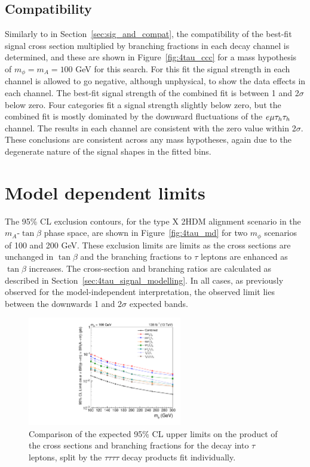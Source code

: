 \subsection{Compatibility}

Similarly to in Section~\ref{sec:sig_and_compat}, the compatibility of the best-fit signal cross section multiplied by branching fractions in each decay channel is determined, and these are shown in Figure~\ref{fig:4tau_ccc} for a mass hypothesis of $m_{\phi}=m_{A}=100$ GeV for this search.
For this fit the signal strength in each channel is allowed to go negative, although unphysical, to show the data effects in each channel.
The best-fit signal strength of the combined fit is between 1 and 2$\sigma$ below zero.
Four categories fit a signal strength slightly below zero, but the combined fit is mostly dominated by the downward fluctuations of the $e\mu\tau_{h}\tau_{h}$ channel.
The results in each channel are consistent with the zero value within 2$\sigma$.
These conclusions are consistent across any mass hypotheses, again due to the degenerate nature of the signal shapes in the fitted bins.

\section{Model dependent limits}

The 95\% \ac{CL} exclusion contours, for the type X \ac{2HDM} alignment scenario in the $m_A$-$\tan\beta$ phase space, are shown in Figure~\ref{fig:4tau_md} for two $m_{\phi}$ scenarios of 100 and 200 GeV.
These exclusion limits are  limits as the cross sections are unchanged in $\tan\beta$ and the branching fractions to $\tau$ leptons are enhanced as $\tan\beta$ increases.
The cross-section and branching ratios are calculated as described in Section~\ref{sec:4tau_signal_modelling}.
In all cases, as previously observed for the model-independent interpretation, the observed limit lies between the downwards 1 and 2$\sigma$ expected bands. \\


\begin{figure}[!hbtp]
\centering
    \includegraphics[width=0.6\textwidth]{Figures/limit_comparison_4tau.pdf}
\caption{Comparison of the expected 95\% CL upper limits on the product of the cross sections and branching fractions for the decay into $\tau$ leptons, split by the $\tau\tau\tau\tau$ decay products fit individually.}
\label{fig:4tau_limit_comparison}
\end{figure}

